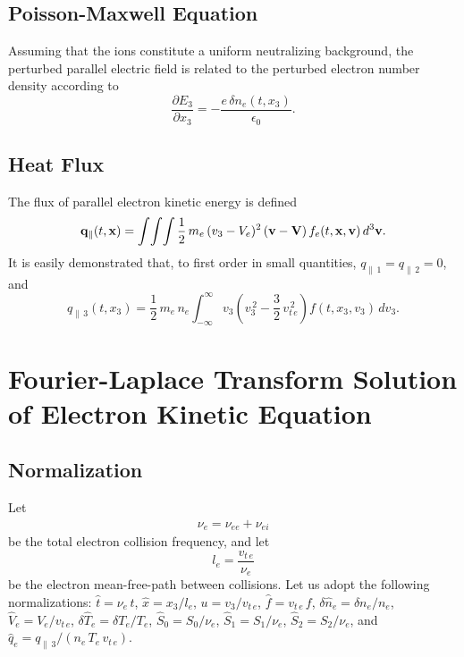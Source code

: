 \documentclass[12pt,prb,aps]{revtex4-1}
\begin{document}
\subsection{Poisson-Maxwell Equation}
Assuming that the ions constitute a uniform neutralizing background, the perturbed parallel electric field is related to the perturbed electron number
density according to
\begin{equation}\label{pois}
\frac{\partial  E_3}{\partial x_3}=-\frac{e\,\delta n_e(t,x_3)}{\epsilon_0}.
\end{equation}

\subsection{Heat Flux}
The flux of parallel electron kinetic energy is defined\,\cite{rf0}
\begin{equation}
{\bf q}_\parallel(t,{\bf x}) =  \int\!\int\!\int \frac{1}{2}\,m_e\,(v_3-V_e)^2\,({\bf v}-{\bf V})\,f_e(t,{\bf x},{\bf v})\,d^3{\bf v}.
\end{equation}
It is easily demonstrated that, to first order in small quantities, $q_{\parallel\,1}=q_{\parallel\,2}=0$, and
\begin{equation}\label{q3}
q_{\parallel\,3}(t,x_3) = \frac{1}{2}\,m_e\,n_e\int_{-\infty}^\infty v_3\left(v_3^{\,2}
-\frac{3}{2}\,v_{t\,e}^{\,2}\right)f(t,x_3,v_3)\,dv_3.
\end{equation}

\section{Fourier-Laplace Transform Solution of Electron Kinetic Equation}\label{s3}
\subsection{Normalization}
Let
\begin{align}\label{enu}
\nu_e= \nu_{ee}+\nu_{ei}
\end{align}
be the total electron collision frequency, and
let
\begin{equation}\label{el}
l_e= \frac{v_{t\,e}}{\nu_e}
\end{equation}
be the electron mean-free-path between collisions. 
Let us adopt the following normalizations: 
$\hat{t} = \nu_{e}\,t$,
$\hat{x}= x_3/l_e$,
$u = v_3/v_{t\,e}$,
$\hat{f}= v_{t\,e}\,f$,
$\delta\hat{n}_e= \delta n_e/n_e$,
$\hat{V}_e= V_e/v_{t\,e}$,
$\delta\hat{T}_e= \delta T_e/T_e$,
$\hat{S}_0 = S_0/\nu_{e}$,
$\hat{S}_1 = S_1/\nu_{e}$,
$\hat{S}_2= S_2/\nu_{e}$, and
$\hat{q}_e=q_{\parallel\,3}/(n_e\,T_e\,v_{t\,e})$.
 
\end{document}

